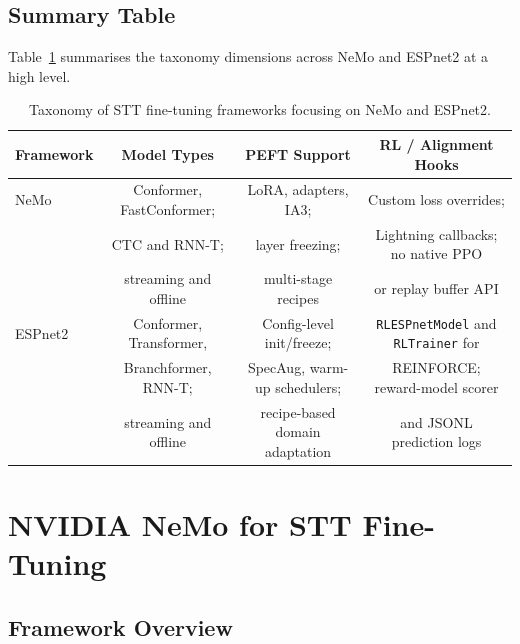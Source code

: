 \documentclass[conference]{IEEEtran}
\begin{document}
\subsection{Summary Table}

Table~\ref{tab:taxonomy} summarises the taxonomy dimensions across NeMo and ESPnet2 at a high level.

\begin{table}[t]
\centering
\caption{Taxonomy of STT fine-tuning frameworks focusing on NeMo and ESPnet2.}
\begin{tabular}{lccc}
\toprule
Framework & Model Types & PEFT Support & RL / Alignment Hooks \\
\midrule
NeMo &
Conformer, FastConformer; &
LoRA, adapters, IA3; &
Custom loss overrides; \\
&
CTC and RNN-T; &
layer freezing; &
Lightning callbacks; no native PPO \\
&
streaming and offline &
multi-stage recipes &
or replay buffer API \\
\midrule
ESPnet2 &
Conformer, Transformer, &
Config-level init/freeze; &
\texttt{RLESPnetModel} and \texttt{RLTrainer} for \\
&
Branchformer, RNN-T; &
SpecAug, warm-up schedulers; &
REINFORCE; reward-model scorer \\
&
streaming and offline &
recipe-based domain adaptation &
and JSONL prediction logs \\
\bottomrule
\end{tabular}
\label{tab:taxonomy}
\end{table}


\section{NVIDIA NeMo for STT Fine-Tuning}



\label{sec:nemo}

\subsection{Framework Overview}
\end{document}
